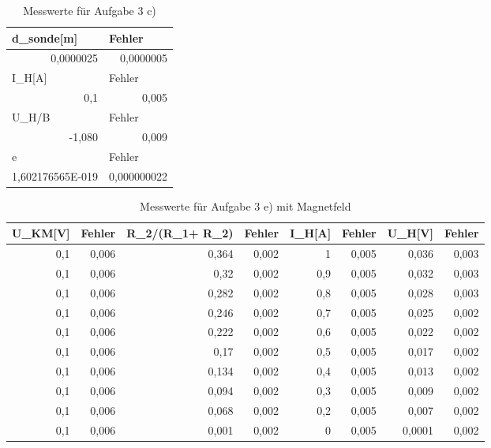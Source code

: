 \documentclass[12pt]{scrartcl}
\begin{document}
\begin{table}[htbp]
\caption{Messwerte für Aufgabe 3 c)}
\begin{center}
\begin{tabular}{|l|l|}
\hline
d\_sonde[m] & Fehler \\ \hline
\multicolumn{1}{|r|}{0,0000025} & \multicolumn{1}{r|}{0,0000005} \\ \hline
I\_H[A] & Fehler \\ \hline
\multicolumn{1}{|r|}{0,1} & \multicolumn{1}{r|}{0,005} \\ \hline
U\_H/B & Fehler \\ \hline
\multicolumn{1}{|r|}{-1,080} & \multicolumn{1}{r|}{0,009} \\ \hline
e & Fehler \\ \hline
\multicolumn{1}{|r|}{1,602176565E-019} & \multicolumn{1}{r|}{0,000000022} \\ \hline
\end{tabular}
\end{center}
\label{aufgabe_3_c}
\end{table}


\begin{table}[htbp]
\caption{Messwerte für Aufgabe 3 e) mit Magnetfeld}
\begin{center}
\begin{tabular}{|r|r|r|r|r|r|r|r|}
\hline
\multicolumn{1}{|l|}{U\_KM[V]} & \multicolumn{1}{l|}{Fehler} & \multicolumn{1}{l|}{R\_2/(R\_1+ R\_2)} & \multicolumn{1}{l|}{Fehler} & \multicolumn{1}{l|}{I\_H[A]} & \multicolumn{1}{l|}{Fehler} & \multicolumn{1}{l|}{U\_H[V]} & \multicolumn{1}{l|}{Fehler} \\ \hline
0,1 & 0,006 & 0,364 & 0,002 & 1 & 0,005 & 0,036 & 0,003 \\ \hline
0,1 & 0,006 & 0,32 & 0,002 & 0,9 & 0,005 & 0,032 & 0,003 \\ \hline
0,1 & 0,006 & 0,282 & 0,002 & 0,8 & 0,005 & 0,028 & 0,003 \\ \hline
0,1 & 0,006 & 0,246 & 0,002 & 0,7 & 0,005 & 0,025 & 0,002 \\ \hline
0,1 & 0,006 & 0,222 & 0,002 & 0,6 & 0,005 & 0,022 & 0,002 \\ \hline
0,1 & 0,006 & 0,17 & 0,002 & 0,5 & 0,005 & 0,017 & 0,002 \\ \hline
0,1 & 0,006 & 0,134 & 0,002 & 0,4 & 0,005 & 0,013 & 0,002 \\ \hline
0,1 & 0,006 & 0,094 & 0,002 & 0,3 & 0,005 & 0,009 & 0,002 \\ \hline
0,1 & 0,006 & 0,068 & 0,002 & 0,2 & 0,005 & 0,007 & 0,002 \\ \hline
0,1 & 0,006 & 0,001 & 0,002 & 0 & 0,005 & 0,0001 & 0,002 \\ \hline
\end{tabular}
\end{center}
\label{aufgabe_3_e_m}
\end{table}
\end{document}
